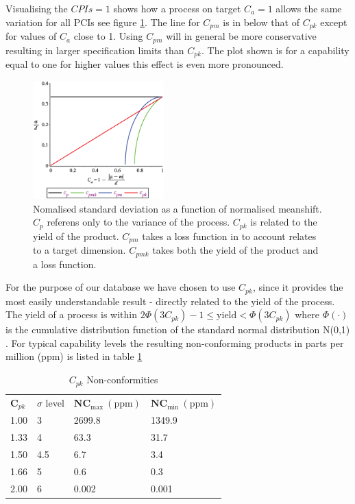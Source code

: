 \documentclass[aip,amsmath, reprint, author-year]{revtex4-1}
\begin{document}
Visualising the $CPIs = 1$  shows how a process on target $C_a = 1$ allows the same variation for all PCIs see figure \ref{fig:CPI}. The line for $C_{pm}$ is in below that of $C_{pk}$ except for values of $C_a$ close to 1. 
Using $C_{pm}$ will in general be more conservative resulting in larger specification limits than $C_{pk}$. The plot shown is for a capability equal to one for higher values this effect is even more pronounced.

\begin{figure}
\includegraphics[width=0.45\textwidth]{graph_postscript_test.eps}
\caption{\label{fig:CPI} Nomalised standard deviation as a function of normalised meanshift. $C_p$ referens only to the variance of the process. $C_{pk}$ is related to the yield of the product. $C_{pm}$ takes a loss function in to account relates to a target dimension. $C_{pmk}$ takes both the yield of the product and a loss function. }
\end{figure}

For the purpose of our database we have chosen to use $C_{pk}$, since it provides the most easily understandable result - directly related to the yield of the process. The yield of a process is within $2\Phi(3C_{pk})-1 \leq \text{yield} < \Phi(3C_{pk})$ where $\Phi(\cdot)$ is the cumulative distribution function of the standard normal distribution N(0,1) \citep{boyles1991taguchi}. For typical capability levels the resulting non-conforming products in parts per million (ppm) is listed in table \ref{tab:cpl_nc}

\begin{table}
\begin{ruledtabular}
\caption{\label{tab:cpl_nc} $C_{pk}$ Non-conformities}
\begin{tabular}{llll}
  $\mathbf{C}_{pk}$	& $\sigma$ level	& $\mathbf{NC_\mathrm{max}} \mathrm{\ (ppm)}$	&  $\mathbf{NC_\mathrm{min}} \mathrm{\ (ppm)}$	\\
  1.00	& 3		& 2699.8		& 1349.9		\\
  1.33 	& 4 		& 63.3		& 31.7 		\\
  1.50 	& 4.5 	& 6.7		& 3.4		\\
  1.66	& 5		& 0.6		& 0.3		\\
  2.00	& 6		& 0.002		& 0.001		\\
\end{tabular}%
\end{ruledtabular}
\end{table}
\end{document}

